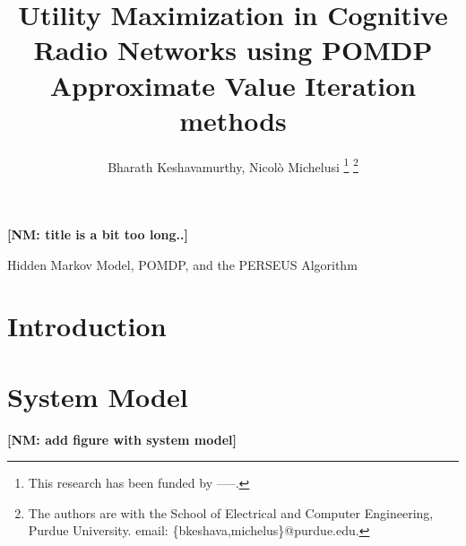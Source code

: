 \documentclass[10pt,twocolumn]{IEEEtran}
\title{Utility Maximization in Cognitive Radio Networks using POMDP Approximate Value Iteration methods}
\author{Bharath Keshavamurthy, Nicol\`{o} Michelusi
\thanks{This research has been funded by -----.}
\thanks{The authors are with the School of Electrical and Computer Engineering, Purdue University. email: \{bkeshava,michelus\}@purdue.edu.}
}
\newcommand{\nm}[1]{{\color{blue}\bf{[NM: #1]}}}
\begin{document}
 
\maketitle
{}
\nm{title is a bit too long..}
\begin{abstract}

\end{abstract}
\begin{IEEEkeywords}
Hidden Markov Model, POMDP, and the PERSEUS Algorithm
\end{IEEEkeywords}
\section{Introduction}
\section{System Model}
\nm{add figure with system model}
\end{document}
